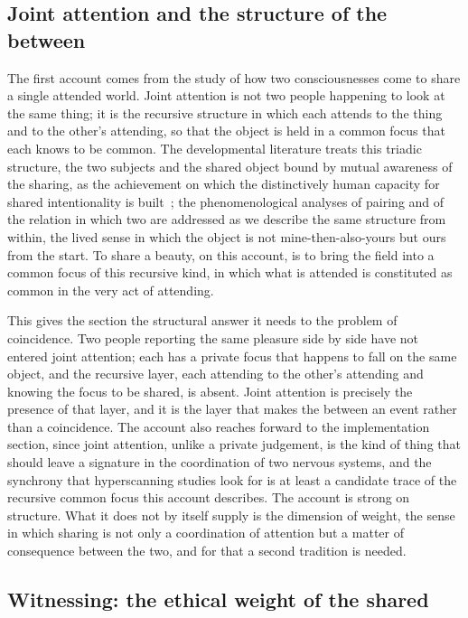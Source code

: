 \subsection{Joint attention and the structure of the between}
\label{p22:sub:sharing-joint-attention}

The first account comes from the study of how two consciousnesses come to share a single attended world. Joint attention is not two people happening to look at the same thing; it is the recursive structure in which each attends to the thing and to the other's attending, so that the object is held in a common focus that each knows to be common. The developmental literature treats this triadic structure, the two subjects and the shared object bound by mutual awareness of the sharing, as the achievement on which the distinctively human capacity for shared intentionality is built~\parencite{tomasello_origins}; the phenomenological analyses of pairing and of the relation in which two are addressed as we describe the same structure from within, the lived sense in which the object is not mine-then-also-yours but ours from the start. To share a beauty, on this account, is to bring the field into a common focus of this recursive kind, in which what is attended is constituted as common in the very act of attending.

This gives the section the structural answer it needs to the problem of coincidence. Two people reporting the same pleasure side by side have not entered joint attention; each has a private focus that happens to fall on the same object, and the recursive layer, each attending to the other's attending and knowing the focus to be shared, is absent. Joint attention is precisely the presence of that layer, and it is the layer that makes the between an event rather than a coincidence. The account also reaches forward to the implementation section, since joint attention, unlike a private judgement, is the kind of thing that should leave a signature in the coordination of two nervous systems, and the synchrony that hyperscanning studies look for is at least a candidate trace of the recursive common focus this account describes. The account is strong on structure. What it does not by itself supply is the dimension of weight, the sense in which sharing is not only a coordination of attention but a matter of consequence between the two, and for that a second tradition is needed.

\subsection{Witnessing: the ethical weight of the shared}
\label{p22:sub:sharing-witnessing}

